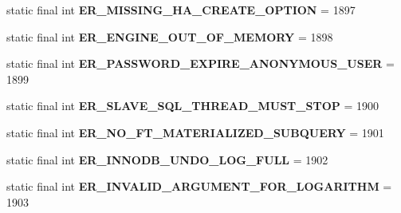 \begin{DoxyCompactItemize}
static final int {\bfseries E\+R\+\_\+\+M\+I\+S\+S\+I\+N\+G\+\_\+\+H\+A\+\_\+\+C\+R\+E\+A\+T\+E\+\_\+\+O\+P\+T\+I\+ON} = 1897
\item 
\mbox{\label{classcom_1_1mysql_1_1cj_1_1exceptions_1_1_mysql_error_numbers_a2d21a523adf9f8931e9e788b3dba7e16}} 
static final int {\bfseries E\+R\+\_\+\+E\+N\+G\+I\+N\+E\+\_\+\+O\+U\+T\+\_\+\+O\+F\+\_\+\+M\+E\+M\+O\+RY} = 1898
\item 
\mbox{\label{classcom_1_1mysql_1_1cj_1_1exceptions_1_1_mysql_error_numbers_a76118837402cfed880b5c3817b5fc5fb}} 
static final int {\bfseries E\+R\+\_\+\+P\+A\+S\+S\+W\+O\+R\+D\+\_\+\+E\+X\+P\+I\+R\+E\+\_\+\+A\+N\+O\+N\+Y\+M\+O\+U\+S\+\_\+\+U\+S\+ER} = 1899
\item 
\mbox{\label{classcom_1_1mysql_1_1cj_1_1exceptions_1_1_mysql_error_numbers_af6a3bff2cd242209f9e516ec52b2ef8a}} 
static final int {\bfseries E\+R\+\_\+\+S\+L\+A\+V\+E\+\_\+\+S\+Q\+L\+\_\+\+T\+H\+R\+E\+A\+D\+\_\+\+M\+U\+S\+T\+\_\+\+S\+T\+OP} = 1900
\item 
\mbox{\label{classcom_1_1mysql_1_1cj_1_1exceptions_1_1_mysql_error_numbers_af731b0af43cc9879bb576c8024de9ff4}} 
static final int {\bfseries E\+R\+\_\+\+N\+O\+\_\+\+F\+T\+\_\+\+M\+A\+T\+E\+R\+I\+A\+L\+I\+Z\+E\+D\+\_\+\+S\+U\+B\+Q\+U\+E\+RY} = 1901
\item 
\mbox{\label{classcom_1_1mysql_1_1cj_1_1exceptions_1_1_mysql_error_numbers_aa619c1762ba348094640fff4e3db169b}} 
static final int {\bfseries E\+R\+\_\+\+I\+N\+N\+O\+D\+B\+\_\+\+U\+N\+D\+O\+\_\+\+L\+O\+G\+\_\+\+F\+U\+LL} = 1902
\item 
\mbox{\label{classcom_1_1mysql_1_1cj_1_1exceptions_1_1_mysql_error_numbers_a6c930ff21e49889cd501ef76bf6e21f4}} 
static final int {\bfseries E\+R\+\_\+\+I\+N\+V\+A\+L\+I\+D\+\_\+\+A\+R\+G\+U\+M\+E\+N\+T\+\_\+\+F\+O\+R\+\_\+\+L\+O\+G\+A\+R\+I\+T\+HM} = 1903
\item 
\mbox{\label{classcom_1_1mysql_1_1cj_1_1exceptions_1_1_mysql_error_numbers_a22b3cff04738c2bbf5aed8cf3db448f5}} 

\end{DoxyCompactItemize}
